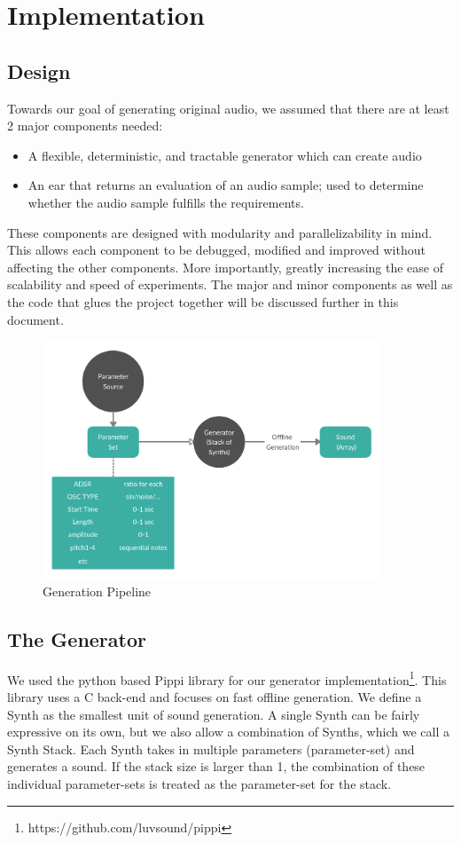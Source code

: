 \documentclass{article}
\begin{document}

\section{Implementation}
\subsection{Design}
Towards our goal of generating original audio, we assumed that there are at least 2 major components needed:
\begin{itemize}
    \item A flexible, deterministic, and tractable generator which can create audio
    \item An ear that returns an evaluation of an audio sample; used to determine whether the audio sample fulfills the requirements. 
\end{itemize}

These components are designed with modularity and parallelizability in mind. This allows each component to be debugged, modified and improved without affecting the other components. More importantly, greatly increasing the ease of scalability and speed of experiments.
The major and minor components as well as the code that glues the project together will be discussed further in this document. 
\begin{figure}[H]
\centering
\includegraphics[width=0.9\textwidth]{images/SSS_gen.png}
\caption{Generation Pipeline}
\label{fig:SSS generator}
\end{figure}

\subsection{The Generator}
We used the python based Pippi library for our generator implementation\footnote{https://github.com/luvsound/pippi}. This library uses a C back-end and focuses on fast offline generation. We define a Synth as the smallest unit of sound generation. A single Synth can be fairly expressive on its own, but we also allow a combination of Synths, which we call a Synth Stack. Each Synth takes in multiple parameters (parameter-set) and generates a sound. If the stack size is larger than 1, the combination of these individual parameter-sets is treated as the parameter-set for the stack. 
\end{document}
